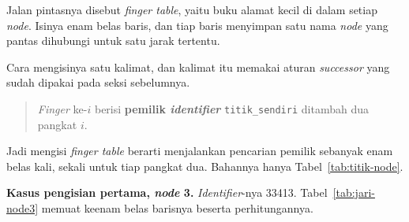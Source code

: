 Jalan pintasnya disebut \textit{finger table}, yaitu buku alamat kecil di dalam
setiap \textit{node}. Isinya enam belas baris, dan tiap baris menyimpan satu
nama \textit{node} yang pantas dihubungi untuk satu jarak tertentu.

Cara mengisinya satu kalimat, dan kalimat itu memakai aturan \textit{successor} yang sudah
dipakai pada seksi sebelumnya.

\begin{quote}
  \textit{Finger} ke-$i$ berisi \textbf{pemilik \textit{identifier}} \texttt{titik\_sendiri} ditambah dua
  pangkat $i$.
\end{quote}

Jadi mengisi \textit{finger table} berarti menjalankan pencarian pemilik
sebanyak enam belas kali, sekali untuk tiap pangkat dua. Bahannya hanya
Tabel~\ref{tab:titik-node}.

\textbf{Kasus pengisian pertama, \textit{node} 3.} \textit{Identifier}-nya 33413.
Tabel~\ref{tab:jari-node3} memuat keenam belas barisnya beserta perhitungannya.

